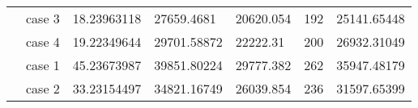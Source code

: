 \begin{table}[]
\begin{tabular}{cllllll}
    \rowcolor[HTML]{FFFFC7} 
    \cellcolor[HTML]{FFFFC7}                                                                                               & case 3                  & 18.23963118                                                                            & 27659.4681                                                                                & 20620.054                                                                           & 192                                                                        & 25141.65448                                                                                \\ \cline{2-7} 
    \rowcolor[HTML]{FFFFC7} 
    \multirow{-4}{*}{\cellcolor[HTML]{FFFFC7}4000}                                                                         & case 4                  & 19.22349644                                                                            & 29701.58872                                                                               & 22222.31                                                                            & 200                                                                        & 26932.31049                                                                                \\ \hline
    \rowcolor[HTML]{FFFFC7} 
    \cellcolor[HTML]{FFFFC7}                                                                                               & case 1                  & 45.23673987                                                                            & 39851.80224                                                                               & 29777.382                                                                           & 262                                                                        & 35947.48179                                                                                \\ \cline{2-7} 
    \rowcolor[HTML]{FFFFC7} 
    \cellcolor[HTML]{FFFFC7}                                                                                               & case 2                  & 33.23154497                                                                            & 34821.16749                                                                               & 26039.854                                                                           & 236                                                                        & 31597.65399                                                                                \\ \cline{2-7} 

\end{tabular}
\end{table}
